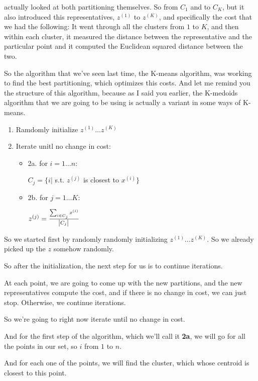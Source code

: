 \documentclass[a4paper, 12pt]{article}
\begin{document}
actually looked at both partitioning themselves. So from \(C_1\) and to
\(C_K\), but it also introduced this representatives, \(z^{(1)}\) to
\(z^{(K)}\), and specifically the cost that we had the following: It went
through all the clusters from \(1\) to \(K\), and then within each cluster, it measured
the distance between the representative and the particular point and it computed
the Euclidean squared distance between the two.

So the algorithm that we've seen last time, the K-means algorithm, was working
to find the best partitioning, which optimizes this costs. And let me remind you
the structure of this algorithm, because as I said you earlier, the K-medoids
algorithm that we are going to be using is actually a variant in some ways of
K-means.

\begin{enumerate}
\item Ramdomly initialize \(z^{(1)} \ldots z^{(K)}\)
\item Iterate unitl no change in cost:
\begin{itemize}
\item 2a. for \(i=1 \ldots n\):

\(C_j = \{i|\) s.t. \(z^{(j)}\) is closest to \(x^{(i)}\}\)

\item 2b. for \(j=1 \ldots K\):

\(z^{(j)} = \frac{\sum_{i \in C_j} x^{(i)}}{\abs{C_j}}\)
\end{itemize}
\end{enumerate}

So we started first by randomly randomly initializing \(z^{(1)} \ldots z^{(K)}\).
So we already picked up the \(z\) somehow randomly.

So after the initialization, the next step for us is to continue iterations.

At each point, we are going to come up with the new partitions, and the new
representatives compute the cost, and if there is no change in cost, we can just
stop. Otherwise, we continue iterations.

So we're going to right now iterate until no change in cost.

And for the first step of the algorithm, which we'll call it \textbf{2a}, we will go for
all the points in our set, so \(i\) from \(1\) to \(n\).

And for each one of the points, we will find the cluster, which whose centroid
is closest to this point.
\end{document}
